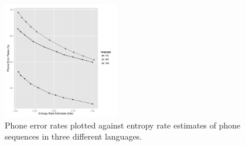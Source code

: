 \begin{figure}[t!]
\begin{center}
\includegraphics[width=2in]{../figs/listper.pdf}
\end{center}
\caption{Phone error rates plotted against entropy rate estimates of phone sequences in three different languages.}
\label{fig:listPER}
\end{figure}
